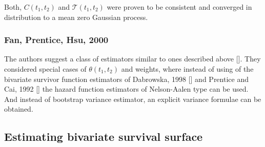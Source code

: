 \documentclass[]{article}
\begin{document}
Both, $C(t_1, t_2)$ and $\mathcal{T}(t_1, t_2)$ were proven to be consistent and converged in distribution to a mean zero Gaussian process.

\subsubsection{Fan, Prentice, Hsu, 2000 \cite{fan2000class}}
The authors suggest a class of estimators similar to ones described above [\cite{fan2000dependence}]. They considered special cases of $\theta(t_1, t_2)$ and weights, where instead of using of the bivariate survivor function estimators of Dabrowska, 1998 [\cite{dabrowska1988kaplan}] and Prentice and Cai, 1992 [\cite{prentice1992covariance}] the hazard function estimators of Nelson-Aalen type can be used. And instead of bootstrap variance estimator, an explicit variance formulae can be obtained.\\





\subsection{Estimating bivariate survival surface}
\end{document}
